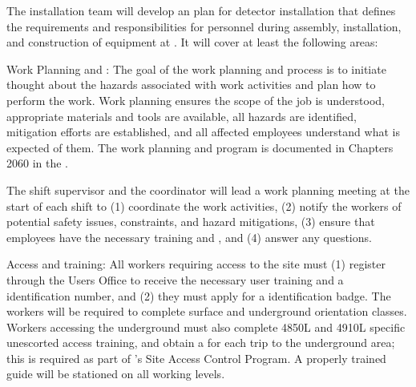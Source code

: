  

The  installation team
 will develop an   plan for detector  installation that defines  
the  requirements and responsibilities for personnel during  assembly, installation, and construction of equipment at . It will cover at least the following areas:

{Work Planning and :} The goal of the work planning and  process is to initiate thought about the hazards associated with work activities and plan how to perform the work. Work planning ensures the scope of the job is understood, appropriate materials and tools are available, all hazards are identified, mitigation efforts are established, and all affected employees understand what is expected of them. 
The work planning and  program is documented in Chapters 2060 in the .

The shift supervisor and the  coordinator  will lead a work planning meeting at the start of each shift  to (1) coordinate the work activities, (2) notify the workers of potential safety issues, constraints, and hazard mitigations, (3) ensure that employees have the necessary  training and , and (4) answer any questions.

{Access and training:}  All  workers requiring access to the  site must (1) register through the  Users Office to receive the necessary user training and a  identification number, and (2) they must apply for a  identification badge. 
The workers will be required to complete  surface and underground orientation classes. Workers accessing the underground must also complete 4850L and 4910L specific unescorted access training, and obtain a  for each trip to the underground area; this is required as part of 's Site Access Control Program. 
A properly trained guide will be stationed on all working levels. 

